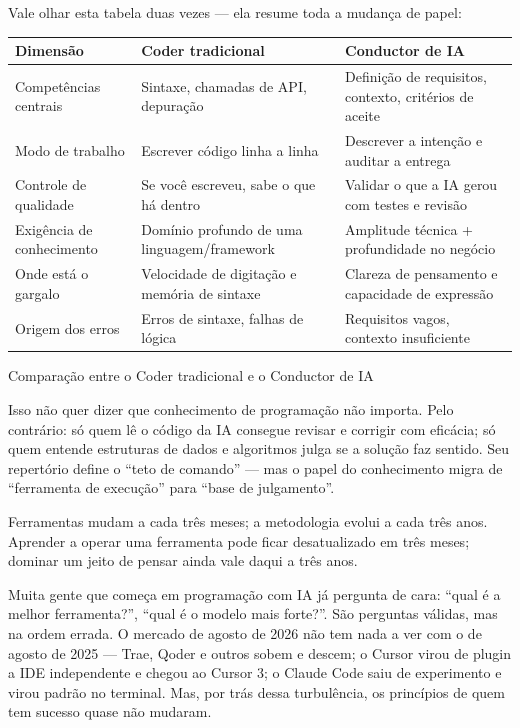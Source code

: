 Vale olhar esta tabela duas vezes — ela resume toda a mudança de papel:

\begin{center}
\begin{tabularx}{\linewidth}{|X|X|X|}
\hline
\textbf{Dimensão} & \textbf{Coder tradicional} & \textbf{Conductor de IA} \tabularnewline
\hline
Competências centrais & Sintaxe, chamadas de API, depuração & Definição de requisitos, contexto, critérios de aceite \tabularnewline
Modo de trabalho & Escrever código linha a linha & Descrever a intenção e auditar a entrega \tabularnewline
Controle de qualidade & Se você escreveu, sabe o que há dentro & Validar o que a IA gerou com testes e revisão \tabularnewline
Exigência de conhecimento & Domínio profundo de uma linguagem/framework & Amplitude técnica + profundidade no negócio \tabularnewline
Onde está o gargalo & Velocidade de digitação e memória de sintaxe & Clareza de pensamento e capacidade de expressão \tabularnewline
Origem dos erros & Erros de sintaxe, falhas de lógica & Requisitos vagos, contexto insuficiente \tabularnewline
\hline
\end{tabularx}
\end{center}

\begin{center}\small\color{gray}Comparação entre o Coder tradicional e o Conductor de IA\end{center}

Isso não quer dizer que conhecimento de programação não importa. Pelo contrário: só quem lê o código da IA consegue revisar e corrigir com eficácia; só quem entende estruturas de dados e algoritmos julga se a solução faz sentido. Seu repertório define o “teto de comando” — mas o papel do conhecimento migra de “ferramenta de execução” para “base de julgamento”.


Ferramentas mudam a cada três meses; a metodologia evolui a cada três anos. Aprender a operar uma ferramenta pode ficar desatualizado em três meses; dominar um jeito de pensar ainda vale daqui a três anos.

Muita gente que começa em programação com IA já pergunta de cara: “qual é a melhor ferramenta?”, “qual é o modelo mais forte?”. São perguntas válidas, mas na ordem errada. O mercado de agosto de 2026 não tem nada a ver com o de agosto de 2025 — Trae, Qoder e outros sobem e descem; o Cursor virou de plugin a IDE independente e chegou ao Cursor 3; o Claude Code saiu de experimento e virou padrão no terminal. Mas, por trás dessa turbulência, os princípios de quem tem sucesso quase não mudaram.

